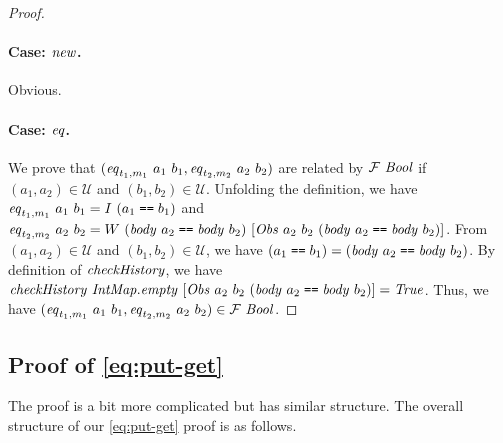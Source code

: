 \documentclass{article}
\theoremstyle{definition}
\newcommand{\texteq}{\mathrel{\texttt{==}}}
\begin{document}
\begin{proof}

\paragraph{Case: $\mathit{new}$.} Obvious. 

\paragraph{Case: $\mathit{eq}$.} 
We prove that $(\mathit{eq}_{t_1,m_1}~a_1~b_1, \mathit{eq}_{t_2,m_2}~a_2~b_2)$
are related by $\mathcal{F}~\mathit{Bool}$ if $(a_1,a_2) \in \mathcal{U}$
and $(b_1,b_2) \in \mathcal{U}$. 
Unfolding the definition, we have $\mi{eq}_{t_1,m_1}~a_1~b_1 = I~(a_1 \texteq b_1)$
 and $\mi{eq}_{t_2,m_2}~a_2~b_2 = W~
(\mi{body}~a_2 \texteq
\mi{body}~b_2)~
[\mi{Obs}~a_2~b_2~(\mi{body}~a_2 \texteq
\mi{body}~b_2)]$. 
From $(a_1,a_2) \in \mathcal{U}$ and
$(b_1,b_2) \in \mathcal{U}$, we have $(a_1 \texteq b_1) = (\mi{body}~a_2
\texteq \mi{body}~b_2)$.
By definition of $\mathit{checkHistory}$, we have 
$\mi{checkHistory}~\mi{IntMap.empty}~[\mi{Obs}~a_2~b_2~(\mi{body}~a_2 \texteq
\mi{body}~b_2)] = \mi{True}$.
Thus, we have $(\mathit{eq}_{t_1,m_1}~a_1~b_1, \mathit{eq}_{t_2,m_2}~a_2~b_2) \in \mathcal{F}~\mathit{Bool}$.
\end{proof}

\subsection{Proof of \ref{eq:put-get}}

The proof is a bit more complicated but has similar structure.
The overall structure of our \ref{eq:put-get} proof is as follows. 
\end{document}
